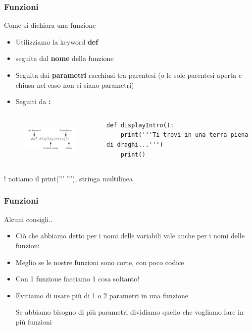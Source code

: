 \begin{frame}[fragile]
\frametitle{Funzioni}
        \begin{block}{Come si dichiara una funzione}
            \begin{itemize}
                \item Utilizziamo la keyword \textbf{def}
                \item seguita dal \textbf{nome} della funzione
                \item Seguita dai \textbf{parametri} racchiusi tra parentesi (o le sole parentesi aperta e chiusa nel caso non ci siano parametri)
                \item Seguiti da \textbf{:}
            \end{itemize}
        \end{block}

        \begin{columns}
	    \begin{column}{4cm}
			\begin{figure}
   				\includegraphics[height=2cm]{images/function_signature_example.png}
			\end{figure}
		\end{column}
		
		\begin{column}{6cm}
            \begin{lstlisting}
def displayIntro():
    print('''Ti trovi in una terra piena di draghi...''')
    print()
            \end{lstlisting}
		\end{column}
	\end{columns}
	! notiamo il print(''' '''), stringa multilinea
\end{frame}

\begin{frame}
\frametitle{Funzioni}
    \begin{block}{Alcuni consigli..}
        \begin{itemize}
            \item Ciò che abbiamo detto per i nomi delle variabili vale anche per i nomi delle funzioni
            \item Meglio se le nostre funzioni sono corte, con poco codice
            \item  Con 1 funzione facciamo 1 cosa soltanto!
            \item Evitiamo di usare più di 1 o 2 parametri in una funzione
            
            Se abbiamo bisogno di più parametri dividiamo quello che vogliamo fare in più funzioni
        \end{itemize}
    \end{block}
\end{frame}

